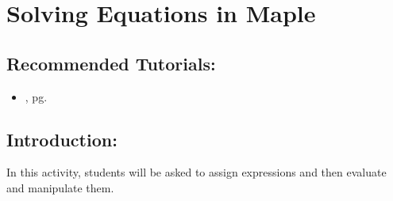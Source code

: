 \section{Solving Equations in Maple}
\label{sec:solving_equations_in_maple}		

\subsection*{Recommended Tutorials:}
\begin{itemize}[noitemsep]
	\item {}, pg. \pageref{chp:equation_solvers}
\end{itemize}

\subsection*{Introduction:}

In this activity, students will be asked to assign expressions and then evaluate and manipulate them.

